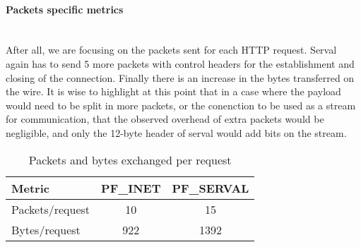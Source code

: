 \paragraph{Packets specific metrics} \hfill \\
After all, we are focusing on the packets sent for each HTTP request.
Serval again has to send 5 more packets with control headers for the establishment and closing of the connection.
Finally there is an increase in the bytes transferred on the wire.
It is wise to highlight at this point that in a case where the payload would need to be split in more packets, or the conenction to be used as a stream for communication, that the observed overhead of extra packets would be negligible, and only the 12-byte header of serval would add bits on the stream.
\begin{table}
\begin{center}
  \begin{tabular}{l||c|c}
  	\toprule
  	Metric				&	PF\_INET	&	PF\_SERVAL	\\
  	\midrule
    Packets/request		&	10			&	15			\\
    Bytes/request		&	922			&	1392		\\
    \bottomrule
  \end{tabular}
  \caption[Benchmark: Packets and bytes exchanged per request]{Packets and bytes exchanged per request}
  \label{table:packets}
\end{center}
\end{table}

\newpage
